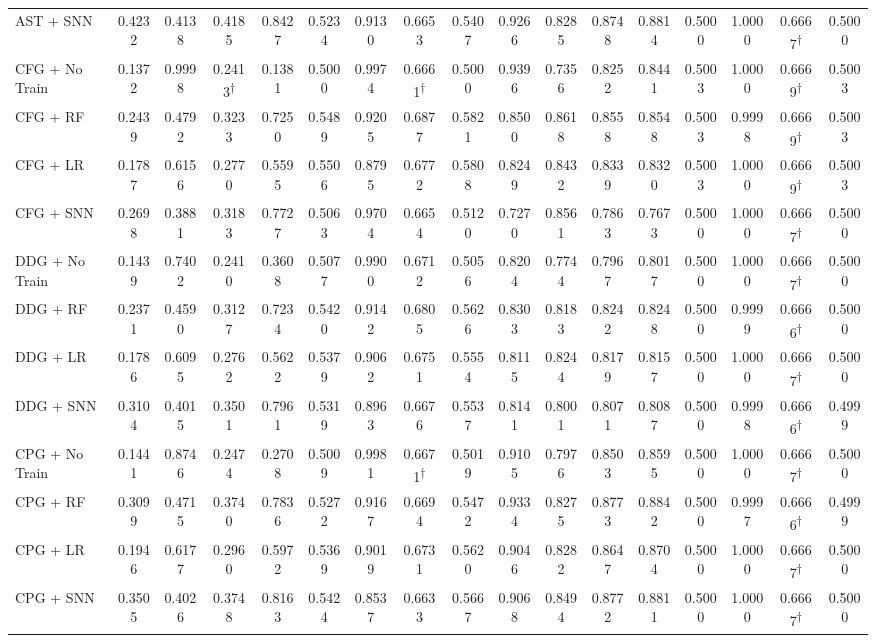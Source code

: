 \documentclass[authoryear,final,5p,times,twocolumn]{elsarticle}
\newcommand{\degscore}[1]{%
  \cellcolor{red!10}#1\textsuperscript{\ensuremath{\dagger}}}
\theoremstyle{plain}
\begin{document}
\begin{table}[t]
{\begin{tabular}{@{}l*{16}{c}@{}}
AST + SNN & 0.4232 & 0.4138 & 0.4185 & 0.8427 & 0.5234 & 0.9130 & 0.6653 & 0.5407 & 0.9266 & 0.8285 & 0.8748 & 0.8814 & 0.5000 & 1.0000 & \degscore{0.6667} & 0.5000 \\
CFG + No Train & 0.1372 & 0.9998 & \degscore{0.2413} & 0.1381 & 0.5000 & 0.9974 & \degscore{0.6661} & 0.5000 & 0.9396 & 0.7356 & 0.8252 & 0.8441 & 0.5003 & 1.0000 & \degscore{0.6669} & 0.5003 \\
CFG + RF & 0.2439 & 0.4792 & 0.3233 & 0.7250 & 0.5489 & 0.9205 & 0.6877 & 0.5821 & 0.8500 & 0.8618 & 0.8558 & 0.8548 & 0.5003 & 0.9998 & \degscore{0.6669} & 0.5003 \\
CFG + LR & 0.1787 & 0.6156 & 0.2770 & 0.5595 & 0.5506 & 0.8795 & 0.6772 & 0.5808 & 0.8249 & 0.8432 & 0.8339 & 0.8320 & 0.5003 & 1.0000 & \degscore{0.6669} & 0.5003 \\
CFG + SNN & 0.2698 & 0.3881 & 0.3183 & 0.7727 & 0.5063 & 0.9704 & 0.6654 & 0.5120 & 0.7270 & 0.8561 & 0.7863 & 0.7673 & 0.5000 & 1.0000 & \degscore{0.6667} & 0.5000 \\
DDG + No Train & 0.1439 & 0.7402 & 0.2410 & 0.3608 & 0.5077 & 0.9900 & 0.6712 & 0.5056 & 0.8204 & 0.7744 & 0.7967 & 0.8017 & 0.5000 & 1.0000 & \degscore{0.6667} & 0.5000 \\
DDG + RF & 0.2371 & 0.4590 & 0.3127 & 0.7234 & 0.5420 & 0.9142 & 0.6805 & 0.5626 & 0.8303 & 0.8183 & 0.8242 & 0.8248 & 0.5000 & 0.9999 & \degscore{0.6666} & 0.5000 \\
DDG + LR & 0.1786 & 0.6095 & 0.2762 & 0.5622 & 0.5379 & 0.9062 & 0.6751 & 0.5554 & 0.8115 & 0.8244 & 0.8179 & 0.8157 & 0.5000 & 1.0000 & \degscore{0.6667} & 0.5000 \\
DDG + SNN & 0.3104 & 0.4015 & 0.3501 & 0.7961 & 0.5319 & 0.8963 & 0.6676 & 0.5537 & 0.8141 & 0.8001 & 0.8071 & 0.8087 & 0.5000 & 0.9998 & \degscore{0.6666} & 0.4999 \\
CPG + No Train & 0.1441 & 0.8746 & 0.2474 & 0.2708 & 0.5009 & 0.9981 & \degscore{0.6671} & 0.5019 & 0.9105 & 0.7976 & 0.8503 & 0.8595 & 0.5000 & 1.0000 & \degscore{0.6667} & 0.5000 \\
CPG + RF & 0.3099 & 0.4715 & 0.3740 & 0.7836 & 0.5272 & 0.9167 & 0.6694 & 0.5472 & 0.9334 & 0.8275 & 0.8773 & 0.8842 & 0.5000 & 0.9997 & \degscore{0.6666} & 0.4999 \\
CPG + LR & 0.1946 & 0.6177 & 0.2960 & 0.5972 & 0.5369 & 0.9019 & 0.6731 & 0.5620 & 0.9046 & 0.8282 & 0.8647 & 0.8704 & 0.5000 & 1.0000 & \degscore{0.6667} & 0.5000 \\
CPG + SNN & 0.3505 & 0.4026 & 0.3748 & 0.8163 & 0.5424 & 0.8537 & 0.6633 & 0.5667 & 0.9068 & 0.8494 & 0.8772 & 0.8811 & 0.5000 & 1.0000 & \degscore{0.6667} & 0.5000 \\

\end{tabular}}
\end{table}
\end{document}
